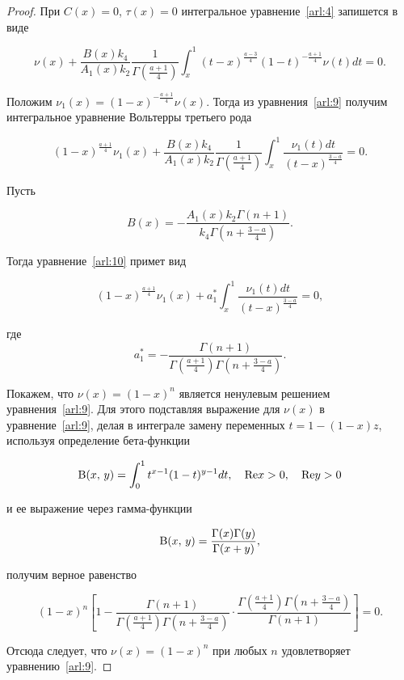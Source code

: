 \begin{proof} При $C(x)=0$, $\tau(x)=0$ интегральное уравнение~\eqref{arl:4} запишется в виде

\begin{equation}

\nu(x)+\frac{B(x)k_4}{A_1(x)k_2}\frac{1}{\Gamma\left(\frac{a+1}{4}\right)}\int_{x}^{1}(t-x)^{\frac{a-3}{4}}(1-t)^{-\frac{a+1}{4}}\nu(t)dt=0.

\label{arl:9}

\end{equation}

Положим $\nu_1(x)=(1-x)^{-\frac{a+1}{4}}\nu(x)$. Тогда из уравнения~\eqref{arl:9} получим интегральное уравнение Вольтерры третьего рода \cite{arl:bib:9}

\begin{equation}

(1-x)^{\frac{a+1}{4}}\nu_1(x)+\frac{B(x)k_4}{A_1(x)k_2}\frac{1}{\Gamma\left(\frac{a+1}{4}\right)}\int_{x}^{1}\frac{\nu_1(t)dt}{(t-x)^{\frac{3-a}{4}}}=0.

\label{arl:10}

\end{equation}

Пусть

$$B(x)=-\frac{A_1(x)k_2\Gamma\left(n+1\right)}{k_4\Gamma\left(n+\frac{3-a}{4}\right)}.$$

Тогда уравнение~\eqref{arl:10} примет вид

$$

(1-x)^{\frac{a+1}{4}}\nu_1(x)+a^*_1\int_{x}^{1}\frac{\nu_1(t)dt}{(t-x)^{\frac{3-a}{4}}}=0,

$$

где $$a^*_1=-\frac{\Gamma(n+1)}{\Gamma\left(\frac{a+1}{4}\right)\Gamma\left(n+\frac{3-a}{4}\right)}.$$



Покажем, что $\nu(x)=(1-x)^n$ является ненулевым решением уравнения~\eqref{arl:9}. Для этого подставляя выражение для $\nu(x)$ в уравнение~\eqref{arl:9}, делая в интеграле замену переменных $t=1-(1-x)z$, используя определение бета-функции~\cite{arl:bib:8}

$${\rm B}(x,\,y)=\int_{0}^{1}t^{x-1}(1-t)^{y-1}dt, \quad {\rm Re} x>0, \quad {\rm Re} y>0$$

и ее выражение через гамма-функции~\cite{arl:bib:8}

$${\rm B}(x,\,y)=\frac{\Gamma(x)\Gamma(y)}{\Gamma(x+y)},$$

получим верное равенство

$$(1-x)^n\left[1-\frac{\Gamma(n+1)}{\Gamma\left(\frac{a+1}{4}\right)\Gamma\left(n+\frac{3-a}{4}\right)}\cdot \frac{\Gamma\left(\frac{a+1}{4}\right)\Gamma\left(n+\frac{3-a}{4}\right)}{\Gamma(n+1)}\right]=0.$$

Отсюда следует, что $\nu(x)=(1-x)^n$ при любых $n$ удовлетворяет уравнению~\eqref{arl:9}.\end{proof}



